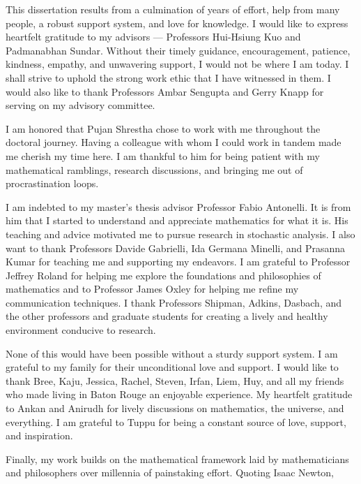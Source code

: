 
This dissertation results from a culmination of years of effort, help from many people, a robust support system, and love for knowledge. I would like to express heartfelt gratitude to my advisors — Professors Hui-Hsiung Kuo and Padmanabhan Sundar. Without their timely guidance, encouragement, patience, kindness, empathy, and unwavering support, I would not be where I am today. I shall strive to uphold the strong work ethic that I have witnessed in them. I would also like to thank Professors Ambar Sengupta and Gerry Knapp for serving on my advisory committee.

I am honored that Pujan Shrestha chose to work with me throughout the doctoral journey. Having a colleague with whom I could work in tandem made me cherish my time here. I am thankful to him for being patient with my mathematical ramblings, research discussions, and bringing me out of procrastination loops.

I am indebted to my master's thesis advisor Professor Fabio Antonelli. It is from him that I started to understand and appreciate mathematics for what it is. His teaching and advice motivated me to pursue research in stochastic analysis. I also want to thank Professors Davide Gabrielli, Ida Germana Minelli, and Prasanna Kumar for teaching me and supporting my endeavors. I am grateful to Professor Jeffrey Roland for helping me explore the foundations and philosophies of mathematics and to Professor James Oxley for helping me refine my communication techniques. I thank Professors Shipman, Adkins, Dasbach, and the other professors and graduate students for creating a lively and healthy environment conducive to research.

None of this would have been possible without a sturdy support system. I am grateful to my family for their unconditional love and support. I would like to thank Bree, Kaju, Jessica, Rachel, Steven, Irfan, Liem, Huy, and all my friends who made living in Baton Rouge an enjoyable experience. My heartfelt gratitude to Ankan and Anirudh for lively discussions on mathematics, the universe, and everything. I am grateful to Tuppu for being a constant source of love, support, and inspiration.

Finally, my work builds on the mathematical framework laid by mathematicians and philosophers over millennia of painstaking effort. Quoting Isaac Newton, 
